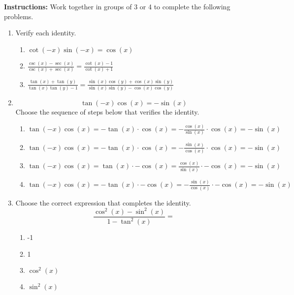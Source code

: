 


\noindent \textbf{Instructions:}  Work together in groups of  3 or 4 to complete the following problems.\\

\begin{enumerate}



\item Verify each identity.
\begin{enumerate}

\item $\cot(-x)\sin(-x)=\cos(x)$

\vfill
\item $\displaystyle \frac{\csc(x)-\sec(x)}{\csc(x)+\sec(x)}=\frac{\cot(x)-1}{\cot(x)+1}$

\vfill
\vfill
\newpage
\item $\displaystyle \frac{\tan(x)+\tan(y)}{\tan(x)\tan(y)-1}=\frac{\sin(x)\cos(y)+\cos(x)\sin(y)}{\sin(x)\sin(y)-\cos(x)\cos(y)}$
\vfill

\vfill

\end{enumerate}



\newpage
\item $$\tan(-x)\cos(x)=-\sin(x)$$
Choose the sequence of steps below that verifies the identity.

\begin{enumerate}

\item $\displaystyle \tan(-x)\cos(x)=-\tan(x)\cdot \cos(x)=-\frac{\cos(x)}{\sin(x)}\cdot \cos(x)=-\sin(x)$
\item $\displaystyle \tan(-x)\cos(x)=-\tan(x)\cdot \cos(x)=-\frac{\sin(x)}{\cos(x)}\cdot \cos(x)=-\sin(x)$
\item $\displaystyle \tan(-x)\cos(x)=\tan(x)\cdot -\cos(x)=\frac{\cos(x)}{\sin(x)}\cdot -\cos(x)=-\sin(x)$
\item $\displaystyle \tan(-x)\cos(x)=-\tan(x)\cdot -\cos(x)=-\frac{\sin(x)}{\cos(x)}\cdot -\cos(x)=-\sin(x)$

\vfill


\end{enumerate}

\item Choose the correct expression that completes the identity.
$$\frac{\cos^2(x)-\sin^2(x)}{1-\tan^2(x)}=$$
\begin{enumerate}
\item -1
\item 1
\item $\cos^2(x)$
\item $\sin^2(x)$
\end{enumerate}
\vfill
\newpage


\end{enumerate}
